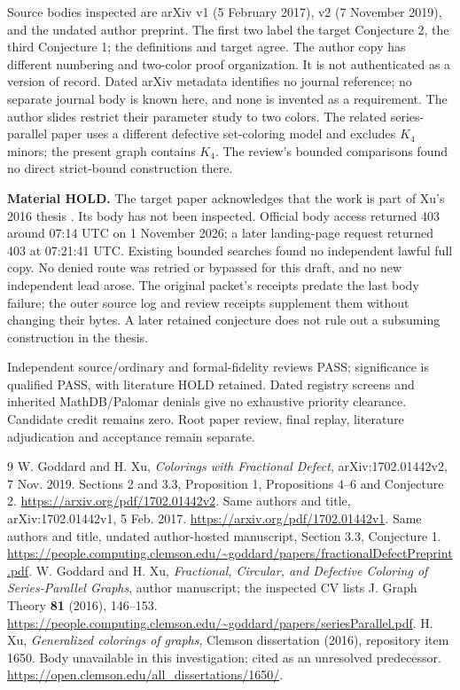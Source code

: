 \documentclass[11pt]{article}
\begin{document}
Source bodies inspected are arXiv v1 (5 February 2017), v2 (7 November 2019),
and the undated author preprint. The first two label the target Conjecture 2,
the third Conjecture 1; the definitions and target agree. The author copy has
different numbering and two-color proof organization. It is not authenticated
as a version of record. Dated arXiv metadata identifies no journal reference;
no separate journal body is known here, and none is invented as a requirement.
The author slides restrict their parameter study to two colors. The related
series-parallel paper \cite{sp} uses a different defective set-coloring model
and excludes $K_4$ minors; the present graph contains $K_4$. The review's
bounded comparisons found no direct strict-bound construction there.

\textbf{Material HOLD.} The target paper acknowledges that the work is part
of Xu's 2016 thesis \cite{xu}. Its body has not been inspected. Official body
access returned 403 around 07:14 UTC on 1 November 2026; a later landing-page
request returned 403 at 07:21:41 UTC. Existing bounded searches found no
independent lawful full copy. No denied route was retried or bypassed for this
draft, and no new independent lead arose. The original packet's receipts
predate the last body failure; the outer source log and review receipts
supplement them without changing their bytes. A later retained conjecture
does not rule out a subsuming construction in the thesis.

Independent source/ordinary and formal-fidelity reviews PASS; significance
is qualified PASS, with literature HOLD retained. Dated registry screens and
inherited MathDB/Palomar denials give no exhaustive priority clearance.
Candidate credit remains zero. Root paper review, final replay, literature
adjudication and acceptance remain separate.

\begin{thebibliography}{9}\footnotesize
{} W. Goddard and H. Xu, \emph{Colorings with Fractional Defect},
arXiv:1702.01442v2, 7 Nov. 2019. Sections 2 and 3.3, Proposition 1,
Propositions 4--6 and Conjecture 2.
\url{https://arxiv.org/pdf/1702.01442v2}.
 Same authors and title, arXiv:1702.01442v1, 5 Feb. 2017.
\url{https://arxiv.org/pdf/1702.01442v1}.
 Same authors and title, undated author-hosted manuscript,
Section 3.3, Conjecture 1.
\url{https://people.computing.clemson.edu/~goddard/papers/fractionalDefectPreprint.pdf}.
 W. Goddard and H. Xu, \emph{Fractional, Circular, and Defective
Coloring of Series-Parallel Graphs}, author manuscript; the inspected CV lists
J. Graph Theory \textbf{81} (2016), 146--153.
\url{https://people.computing.clemson.edu/~goddard/papers/seriesParallel.pdf}.
 H. Xu, \emph{Generalized colorings of graphs}, Clemson dissertation (2016), repository item 1650.
Body unavailable in this investigation; cited as an unresolved predecessor.
\url{https://open.clemson.edu/all_dissertations/1650/}.
\end{thebibliography}
\end{document}
